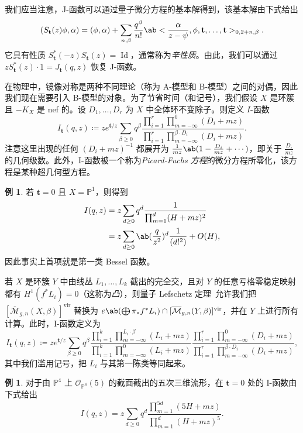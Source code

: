 \documentclass{amsart}
\theoremstyle{definition}
\newtheorem{exm}[thm]{例}
\theoremstyle{remark}
\theoremstyle{plain}
\theoremstyle{definition}
\theoremstyle{remark}
\renewcommand{\P}{\mathbb{P}}
\newcommand{\Mbar}{\overline{\mathcal{M}}}
\newcommand{\mc}[1]{\mathcal{#1}}
\newcommand{\mbf}[1]{\mathbf{#1}}
\newcommand{\mr}[1]{\mathrm{#1}}
\newcommand{\on}[1]{\operatorname{#1}}
\newcommand{\1}{\mathbf{1}}
\newcommand{\2}{\mathbf{2}}
\newcommand{\3}{\mathbf{3}}
\newcommand{\vir}{\mr{vir}}
\begin{document}
我们应当注意，J-函数可以通过量子微分方程的基本解得到，该基本解由下式给出
\[ ( S_{\mbf{t}}(z) \phi , \alpha) = (\phi, \alpha) + \sum_{n, \beta} \frac{q^{\beta}}{n!} \ab<\frac{\alpha}{z-\psi}, \phi, \mbf{t}, \ldots, \mbf{t}>_{0, 2+n, \beta}. \]
它具有性质 \(S_{\mbf{t}}^*(-z) S_{\mbf{t}}(z) = \on{Id}\)，通常称为\textit{辛性质}。由此，我们可以通过 \(z S_{\mbf{t}}^*(z)\cdot 1 = J_{\mbf{t}}(q, z)\) 恢复 J-函数。

在物理中，镜像对称是两种不同理论（称为 A-模型和 B-模型）之间的对偶，因此我们现在需要引入 B-模型的对象。为了节省时间（和记号），我们假设 \(X\) 是环簇且 \(-K_X\) 是 nef 的。设 \(D_1, \ldots, D_r\) 为 \(X\) 中全体环不变除子。则定义 \(I\)-函数
\[
    I_{\mbf{t}}(q, z) \coloneqq z e^{\mbf{t}/z} \sum_{\beta \geq 0} q^{\beta} \frac{\prod_{i=1}^r \prod_{m = -\infty}^{0} (D_i + mz)}{\prod_{i=1}^r \prod_{m=-\infty}^{\beta \cdot D_i} (D_i + mz)}.
\]
注意这里出现的任何 \((D_i + mz)^{-1}\) 都展开为 \(\frac{1}{mz} \ab(1 - \frac{D_i}{mz} + \cdots)\)，即关于 \(\frac{D_i}{mz}\) 的几何级数。此外，I-函数被一个称为\textit{Picard-Fuchs 方程}的微分方程所零化，该方程是某种超几何型方程。

\begin{exm}
    若 \(\mbf{t} = 0\) 且 \(X = \P^1\)，则得到
    \begin{align*}
        I(q,z) &= z\sum_{d \geq 0} q^d \frac{1}{\prod_{m=1}^d (H + mz)^2} \\
        &= z\sum_{d \geq 0} \ab(\frac{q}{z^2})^d \frac{1}{(d!^2)} + O(H),
    \end{align*}
    因此事实上首项就是第一类 Bessel 函数。
\end{exm}

若 \(X\) 是环簇 \(Y\) 中由线丛 \(L_1, \ldots, L_k\) 截出的完全交，且对 \(Y\) 的任意亏格零稳定映射都有 \(H^1(f^* L_i) = 0\)（这称为\textit{凸}），则量子 Lefschetz 定理~\cite{CoatesGivental2007}允许我们把 \([\Mbar_{g,n}(X, \beta)]^{\vir}\) 替换为 \(e\ab(\bigoplus \pi_* f^* L_i) \cap [\Mbar_{g,n}(Y, \beta)]^{\vir}\)，并在 \(Y\) 上进行所有计算。此时，I-函数定义为
\[
    I_{\mbf{t}}(q,z) \coloneqq z e^{\mbf{t}/z} \sum_{\beta \geq 0} q^{\beta} \frac{\prod_{i=1}^k \prod_{m=-\infty}^{L_i \cdot \beta} (L_i + mz)}{\prod_{i=1}^k \prod_{m=-\infty}^{0} (L_i + mz)} \frac{\prod_{i=1}^r \prod_{m = -\infty}^{0} (D_i + mz)}{\prod_{i=1}^r \prod_{m=-\infty}^{\beta \cdot D_i} (D_i + mz)},
\]
其中我们滥用记号，把 \(L_i\) 与其第一陈类等同起来。

\begin{exm}
    对于由 \(\P^4\) 上 \(\mc{O}_{\P^4}(5)\) 的截面截出的五次三维流形，在 \(\mbf{t} = 0\) 处的 I-函数由下式给出
    \[ I(q,z) = z \sum_{d \geq 0} q^d \frac{\prod_{m=1}^{5d}(5H+mz)}{\prod_{m=1}^d (H+mz)^5}. \]
\end{exm}
\end{document}
